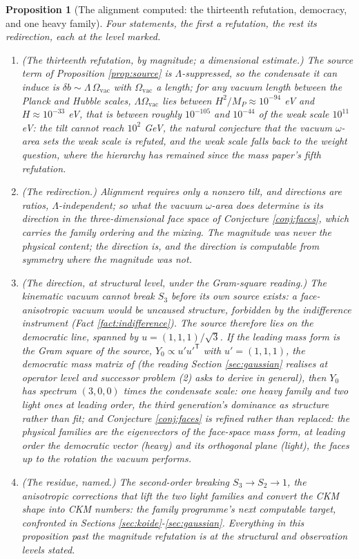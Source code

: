 \documentclass[11pt]{article}
\newtheorem{proposition}[theorem]{Proposition}
\theoremstyle{definition}
\begin{document}
\begin{proposition}[The alignment computed: the thirteenth refutation, democracy, and one heavy family]\label{prop:alignment}
Four statements, the first a refutation, the rest its redirection, each at the level marked.
\begin{enumerate}
\item \emph{(The thirteenth refutation, by magnitude; a dimensional estimate.)} The source term of Proposition \ref{prop:source} is $\Lambda$-suppressed, so the condensate it can induce is $\delta b \sim \Lambda\,\Omega_{\mathrm{vac}}$ with $\Omega_{\mathrm{vac}}$ a length; for any vacuum length between the Planck and Hubble scales, $\Lambda\Omega_{\mathrm{vac}}$ lies between $H^{2}/M_{P} \approx 10^{-94}$ eV and $H \approx 10^{-33}$ eV, that is between roughly $10^{-105}$ and $10^{-44}$ of the weak scale $10^{11}$ eV: the tilt cannot reach $10^{2}$ GeV, the natural conjecture that the vacuum $\omega$-area sets the weak scale is refuted, and the weak scale falls back to the weight question, where the hierarchy has remained since the mass paper's fifth refutation.
\item \emph{(The redirection.)} Alignment requires only a nonzero tilt, and directions are ratios, $\Lambda$-independent; so what the vacuum $\omega$-area does determine is its \emph{direction} in the three-dimensional face space of Conjecture \ref{conj:faces}, which carries the family ordering and the mixing. The magnitude was never the physical content; the direction is, and the direction is computable from symmetry where the magnitude was not.
\item \emph{(The direction, at structural level, under the Gram-square reading.)} The kinematic vacuum cannot break $S_{3}$ before its own source exists: a face-anisotropic vacuum would be uncaused structure, forbidden by the indifference instrument (Fact \ref{fact:indifference}). The source therefore lies on the democratic line, spanned by $u = (1,1,1)/\sqrt{3}$. If the leading mass form is the Gram square of the source, $Y_{0} \propto u' u'^{\mathsf{T}}$ with $u' = (1,1,1)$, the democratic mass matrix of \cite{HHW1978} (the reading Section \ref{sec:gaussian} realises at operator level and successor problem (2) asks to derive in general), then $Y_{0}$ has spectrum $(3, 0, 0)$ times the condensate scale: one heavy family and two light ones at leading order, the third generation's dominance as structure rather than fit; and Conjecture \ref{conj:faces} is refined rather than replaced: the physical families are the \emph{eigenvectors} of the face-space mass form, at leading order the democratic vector (heavy) and its orthogonal plane (light), the faces up to the rotation the vacuum performs.
\item \emph{(The residue, named.)} The second-order breaking $S_{3} \to S_{2} \to 1$, the anisotropic corrections that lift the two light families and convert the CKM shape into CKM numbers: the family programme's next computable target, confronted in Sections \ref{sec:koide}-\ref{sec:gaussian}. Everything in this proposition past the magnitude refutation is at the structural and observation levels stated.
\end{enumerate}
\end{proposition}
\end{document}
